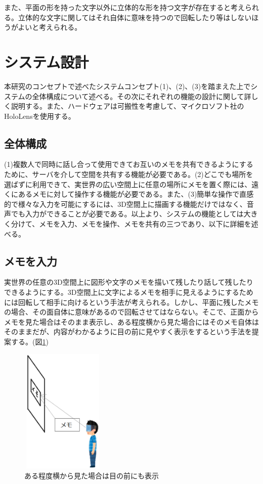 \documentclass[technicalreport]{ieicej}
\begin{document}
また、平面の形を持った文字以外に立体的な形を持つ文字が存在すると考えられる。立体的な文字に関してはそれ自体に意味を持つので回転したり等はしないほうがよいと考えられる。

\section{システム設計}
本研究のコンセプトで述べたシステムコンセプト(1)、(2)、(3)を踏まえた上でシステムの全体構成について述べる。その次にそれぞれの機能の設計に関して詳しく説明する。また、ハードウェアは可搬性を考慮して、マイクロソフト社のHoloLens\cite{hololens}を使用する。

\subsection{全体構成}
(1)複数人で同時に話し合って使用できてお互いのメモを共有できるようにするために、サーバを介して空間を共有する機能が必要である。(2)どこでも場所を選ばずに利用できて、実世界の広い空間上に任意の場所にメモを置く際には、遠くにあるメモに対して操作する機能が必要である。また、(3)簡単な操作で直感的で様々な入力を可能にするには、3D空間上に描画する機能だけではなく、音声でも入力ができることが必要である。以上より、システムの機能としては大きく分けて、メモを入力、メモを操作、メモを共有の三つであり、以下に詳細を述べる。

\subsection{メモを入力}
実世界の任意の3D空間上に図形や文字のメモを描いて残したり話して残したりできるようにする。3D空間上に文字によるメモを相手に見えるようにするためには回転して相手に向けるという手法が考えられる。しかし、平面に残したメモの場合、その面自体に意味があるので回転させてはならない。そこで、正面からメモを見た場合はそのまま表示し、ある程度横から見た場合にはそのメモ自体はそのままだが、内容がわかるように目の前に見やすく表示をするという手法を提案する。(図\ref{fig:memo_wall})

\begin{figure}[h]
  \begin{center}
    \includegraphics[clip,height=6.0cm,width=4.0cm]{./memo_wall.eps}
    \caption{ある程度横から見た場合は目の前にも表示}
    \label{fig:memo_wall}
  \end{center}
\end{figure}
\end{document}
